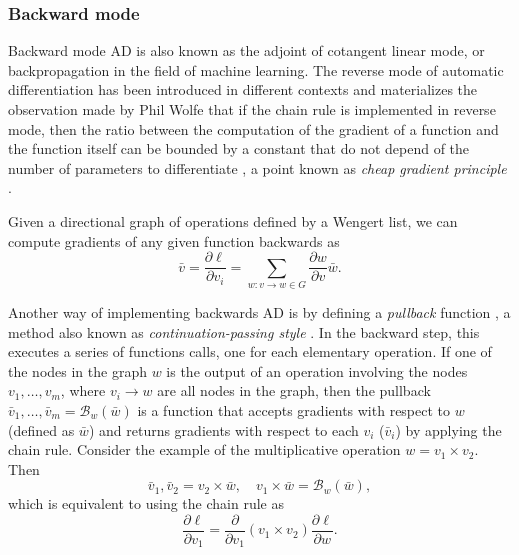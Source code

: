 \subsubsection{Backward mode}

Backward mode AD is also known as the adjoint of cotangent linear mode, or backpropagation in the field of machine learning. 
The reverse mode of automatic differentiation has been introduced in different contexts \cite{griewank2012invented} and materializes the observation made by Phil Wolfe that if the chain rule is implemented in reverse mode, then the ratio between the computation of the gradient of a function and the function itself can be bounded by a constant that do not depend of the number of parameters to differentiate \cite{Griewack-on-AD, Wolfe_1982}, a point known as \textit{cheap gradient principle} \cite{griewank2012invented}.  

Given a directional graph of operations defined by a Wengert list, we can compute gradients of any given function backwards as
\begin{equation}
 \bar v = \frac{\partial \ell}{\partial v_i}= \sum_{w : v \rightarrow w \in G} \frac{\partial w}{\partial v} \bar{w}.
\end{equation}

Another way of implementing backwards AD is by defining a \textit{pullback} function \cite{Innes_2018}, a method also known as \textit{continuation-passing style} \cite{Wang_Zheng_Decker_Wu_Essertel_Rompf_2019}. In the backward step, this executes a series of functions calls, one for each elementary operation.
If one of the nodes in the graph $w$ is the output of an operation involving the nodes $v_1, \ldots, v_m$, where $v_i \rightarrow w$ are all nodes in the graph, then the pullback $\bar v_1, \ldots, \bar v_m = \mathcal B_w(\bar w)$ is a function that accepts gradients with respect to $w$ (defined as $\bar w$) and returns gradients with respect to each $v_i$ ($\bar v_i$) by applying the chain rule. Consider the example of the multiplicative operation $w = v_1 \times v_2$. Then
\begin{equation}
 \bar v_1, \bar v_2 = v_2 \times \bar w , \quad
 v_1 \times \bar w = \mathcal{B}_w (\bar w),
\end{equation}
which is equivalent to using the chain rule as
\begin{equation}
 \frac{\partial \ell}{\partial v_1} = \frac{\partial}{\partial v_1}(v_1 \times v_2) \frac{\partial \ell}{\partial w}.
\end{equation}

